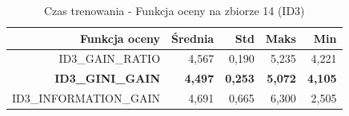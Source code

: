 \begin{table}[htbp]
\centering
\small
\setlength{\tabcolsep}{6pt}
\renewcommand{\arraystretch}{1.2}
\caption{Czas trenowania - Funkcja oceny na zbiorze 14 (ID3)}
\label{tab:ID3_eval_function_14_time}
\begin{tabular}{r|r|r|r|r}
\toprule
Funkcja oceny & Średnia & Std & Maks & Min \\
\hline
ID3\_GAIN\_RATIO & 4,567 & 0,190 & 5,235 & 4,221 \\
\textbf{ID3\_GINI\_GAIN} & \textbf{4,497} & \textbf{0,253} & \textbf{5,072} & \textbf{4,105} \\
ID3\_INFORMATION\_GAIN & 4,691 & 0,665 & 6,300 & 2,505 \\
\bottomrule
\end{tabular}
\end{table}
